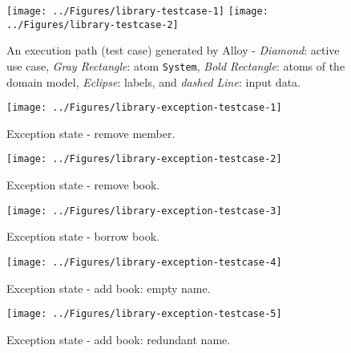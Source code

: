 %
%
\begin{figure*}[h]
\centering
{\texttt{[image: ../Figures/library-testcase-1]}%
\label{fig:library-testcase-1}}
\hfil
{\texttt{[image: ../Figures/library-testcase-2]}%
\label{fig:library-testcase-2}}
\caption{An execution path (test case) generated by Alloy - \textit{Diamond}: active use case, \textit{Gray Rectangle}:  atom \texttt{System}, \textit{Bold Rectangle}: atoms of the domain model, \textit{Eclipse}: labels, and \textit{dashed Line}: input data.}
\label{fig:library-testcase}
\end{figure*} 

\begin{figure}[h]
\centering
\texttt{[image: ../Figures/library-exception-testcase-1]}%
\caption{Exception state - remove member.}
\label{fig:library-exceptions-testcase-1}
\end{figure} 

\begin{figure}[h]
\centering
\texttt{[image: ../Figures/library-exception-testcase-2]}%
\caption{Exception state - remove book.}
\label{fig:library-exceptions-testcase-2}
\end{figure} 

\begin{figure}[h]
\centering
\texttt{[image: ../Figures/library-exception-testcase-3]}%
\caption{Exception state - borrow book.}
\label{fig:library-exceptions-testcase-3}
\end{figure} 

\begin{figure}[h]
\centering
\texttt{[image: ../Figures/library-exception-testcase-4]}%
\caption{Exception state - add book: empty name.}
\label{fig:library-exceptions-testcase-4}
\end{figure} 

\begin{figure}[h]
\centering
\texttt{[image: ../Figures/library-exception-testcase-5]}%
\caption{Exception state - add book: redundant name.}
\label{fig:library-exceptions-testcase-5}
\end{figure} 

